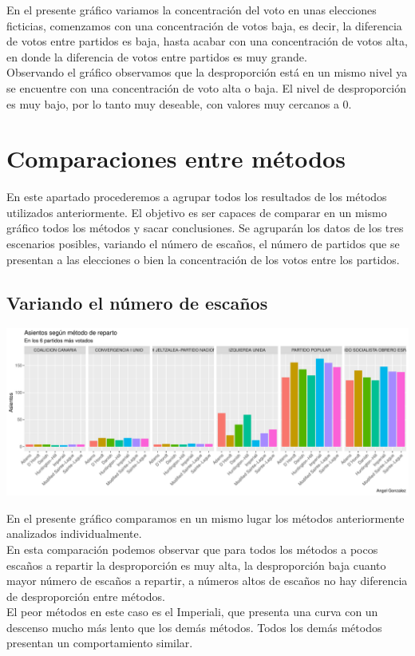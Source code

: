 \documentclass[12pt,a4paper,]{book}
\numberwithin{dummy}{section}
\theoremstyle{ocrenumbox}
\theoremstyle{blacknumex}
\theoremstyle{blacknumbox}
\theoremstyle{ocrenum}
\theoremstyle{ocrenum}
\begin{document}
En el presente gráfico variamos la concentración del voto en unas
elecciones ficticias, comenzamos con una concentración de votos baja, es
decir, la diferencia de votos entre partidos es baja, hasta acabar con
una concentración de votos alta, en donde la diferencia de votos entre
partidos es muy grande.\\
Observando el gráfico observamos que la desproporción está en un mismo
nivel ya se encuentre con una concentración de voto alta o baja. El
nivel de desproporción es muy bajo, por lo tanto muy deseable, con
valores muy cercanos a 0.

\hypertarget{comparaciones-entre-muxe9todos}{%
\section{Comparaciones entre
métodos}\label{comparaciones-entre-muxe9todos}}

En este apartado procederemos a agrupar todos los resultados de los
métodos utilizados anteriormente. El objetivo es ser capaces de comparar
en un mismo gráfico todos los métodos y sacar conclusiones. Se agruparán
los datos de los tres escenarios posibles, variando el número de
escaños, el número de partidos que se presentan a las elecciones o bien
la concentración de los votos entre los partidos.

\hypertarget{variando-el-nuxfamero-de-escauxf1os}{%
\subsection{Variando el número de
escaños}\label{variando-el-nuxfamero-de-escauxf1os}}

\begin{center}\includegraphics[width=0.95\linewidth]{figurasR/unnamed-chunk-64-1} \end{center}

En el presente gráfico comparamos en un mismo lugar los métodos
anteriormente analizados individualmente.\\
En esta comparación podemos observar que para todos los métodos a pocos
escaños a repartir la desproporción es muy alta, la desproporción baja
cuanto mayor número de escaños a repartir, a números altos de escaños no
hay diferencia de desproporción entre métodos.\\
El peor métodos en este caso es el Imperiali, que presenta una curva con
un descenso mucho más lento que los demás métodos. Todos los demás
métodos presentan un comportamiento similar.
\end{document}
